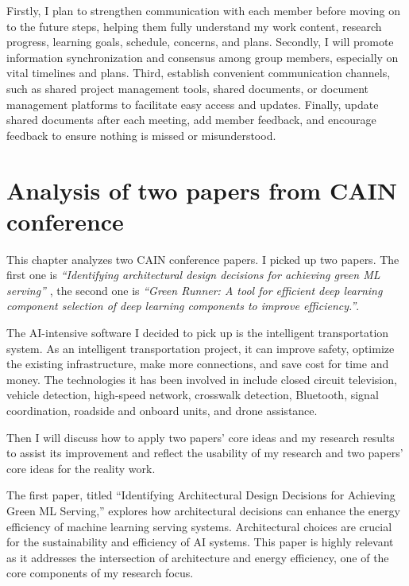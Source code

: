 \documentclass[11pt]{report}
\begin{document}
Firstly, I plan to strengthen communication with each member before moving on to the future steps, helping them fully understand my work content, research progress, learning goals, schedule, concerns, and plans. Secondly, I will promote information synchronization and consensus among group members, especially on vital timelines and plans. Third, establish convenient communication channels, such as shared project management tools, shared documents, or document management platforms to facilitate easy access and updates. Finally, update shared documents after each meeting, add member feedback, and encourage feedback to ensure nothing is missed or misunderstood.

\chapter{Analysis of two papers from CAIN conference}
\label{chap:papers}

This chapter analyzes two CAIN conference papers.
I picked up two papers. The first one is \textit{``Identifying architectural design decisions for achieving green ML serving''} \cite{duran2024identifying}, the second one is \textit{``Green Runner: A tool for efficient deep learning component selection of deep learning components to improve efficiency.''}\cite{kannan2024green}.

The AI-intensive software I decided to pick up is the intelligent transportation system. As an intelligent transportation project, it can improve safety, optimize the existing infrastructure, make more connections, and save cost for time and money. The technologies it has been involved in include closed circuit television, vehicle detection, high-speed network, crosswalk detection, Bluetooth, signal coordination, roadside and onboard units, and drone assistance. 

Then I will discuss how to apply two papers' core ideas and my research results to assist its improvement and reflect the usability of my research and two papers' core ideas for the reality work. 

The first paper, titled ``Identifying Architectural Design Decisions for Achieving Green ML Serving,'' explores how architectural decisions can enhance the energy efficiency of machine learning serving systems. Architectural choices are crucial for the sustainability and efficiency of AI systems. This paper is highly relevant as it addresses the intersection of architecture and energy efficiency, one of the core components of my research focus.
\end{document}
